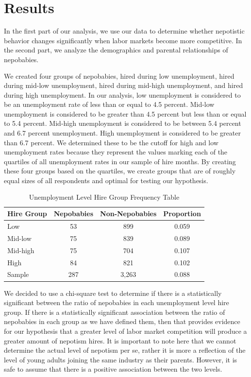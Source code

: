 \documentclass[12pt]{article}
\begin{document}
\section{Results}
\label{sec:result}

In the first part of our analysis, we use our data to determine whether nepotistic behavior changes significantly when labor markets become more competitive. In the second part, we analyze the demographics and parental relationships of nepobabies.


We created four groups of nepobabies, hired during low unemployment, hired during mid-low unemployment, hired during mid-high unemployment, and hired during high unemployment. In our analysis, low unemployment is considered to be an unemployment rate of less than or equal to 4.5 percent. Mid-low unemployment is considered to be greater than 4.5 percent but less than or equal to 5.4 percent. Mid-high unemployment is considered to be between 5.4 percent and 6.7 percent unemployment. High unemployment is considered to be greater than 6.7 percent. We determined these to be the cutoff for high and low unemployment rates because they represent the values marking each of the quartiles of all unemployment rates in our sample of hire months. By creating these four groups based on the quartiles, we create groups that are of roughly equal sizes of all respondents and optimal for testing our hypothesis.

\begin{table}[ht]
\centering
\begin{tabular}{l|cc|c}
Hire Group & Nepobabies & Non-Nepobabies & Proportion \\ 
\hline 
Low & 53 & 899 & 0.059 \\
Mid-low & 75 & 839 & 0.089\\
Mid-high & 75 & 704 & 0.107 \\
High & 84 & 821 & 0.102 \\
\hline 
Sample & 287 & 3,263 & 0.088 \\
\end{tabular}
\caption{Unemployment Level Hire Group Frequency Table}
\label{tab:mytable}
\end{table}



We decided to use a chi-square test to determine if there is a statistically significant between the ratio of nepobabies in each unemployment level hire group. If there is a statistically significant association between the ratio of nepobabies in each group as we have defined them, then that provides evidence for our hypothesis that a greater level of labor market competition will produce a greater amount of nepotism hires. It is important to note here that we cannot determine the actual level of nepotism per se, rather it is more a reflection of the level of young adults joining the same industry as their parents. However, it is safe to assume that there is a positive association between the two levels.
\end{document}
